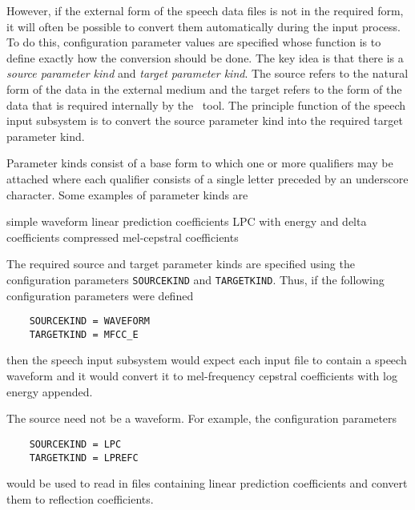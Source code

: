 However, if the external form of the speech data files is not in the
required form, it will often be possible to convert them automatically during
the input process.
To do this, configuration parameter values are specified whose function 
is to define exactly
how the conversion should be done.  
The key idea is that there is a 
\textit{source parameter kind} and \textit{target parameter kind}.
The source refers to the natural form of the data in
the external medium and the target refers to the form of the
data that is required internally by the \HTK\ tool.
The principle function of the speech
input subsystem is to convert the source parameter kind into the 
required target parameter kind. 

Parameter kinds consist of a base form to which one or more
qualifiers may be attached where each qualifier consists of
a single letter preceded by an underscore character.
Some examples of parameter kinds are
\begin{varlist}
    simple waveform
    linear prediction coefficients
    LPC with energy and delta coefficients
     compressed mel-cepstral coefficients
\end{varlist}

The required source and target parameter kinds are specified
using the configuration parameters \texttt{SOURCEKIND}
 and 
\texttt{TARGETKIND}.
Thus, if the following configuration parameters were defined
\begin{verbatim}
    SOURCEKIND = WAVEFORM
    TARGETKIND = MFCC_E
\end{verbatim}
then the speech input subsystem would expect each input file to contain
a speech waveform and it would convert it to mel-frequency cepstral
coefficients with log energy appended.

The source need not be a waveform.  For example, the configuration
parameters
\begin{verbatim}
    SOURCEKIND = LPC
    TARGETKIND = LPREFC
\end{verbatim}
would be used to read in files containing linear prediction coefficients
and convert them to reflection coefficients.

